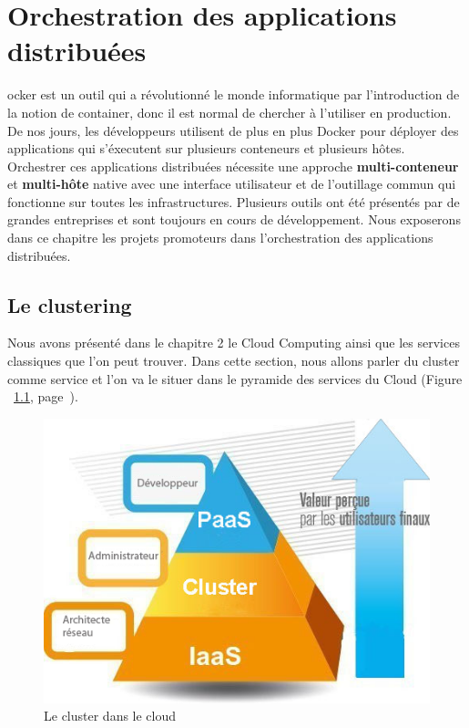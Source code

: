 \chapter{Orchestration des applications distribuées}
\begin{onehalfspace}

ocker est un outil qui a révolutionné le monde informatique par l'introduction de la notion de container, donc il est normal de chercher  à l'utiliser en production. De nos jours, les développeurs utilisent de plus en plus Docker pour déployer des applications qui s'éxecutent sur plusieurs conteneurs et plusieurs hôtes. Orchestrer ces applications distribuées nécessite une approche \textbf{multi-conteneur} et \textbf{multi-hôte} native avec une interface utilisateur et de l'outillage commun qui fonctionne sur toutes les infrastructures. Plusieurs outils ont été présentés par de grandes entreprises et sont toujours en cours de développement. Nous exposerons dans ce chapitre les projets promoteurs dans l'orchestration des applications distribuées.

\newpage

\section{Le clustering}

Nous avons présenté dans le chapitre 2 le Cloud Computing ainsi que les services classiques que l'on peut trouver. Dans cette section, nous allons parler du cluster comme service et l'on va le situer dans le pyramide des services du Cloud (Figure ~\ref{fig:pyramide-cluster}, page~\pageref{fig:pyramide-cluster}).

\begin{figure}[H]
\centering
\includegraphics [scale=0.7]{chapitre3/assets/pyramide}
\caption{Le cluster dans le cloud}
\label{fig:pyramide-cluster}
\end{figure}


\end{onehalfspace}
